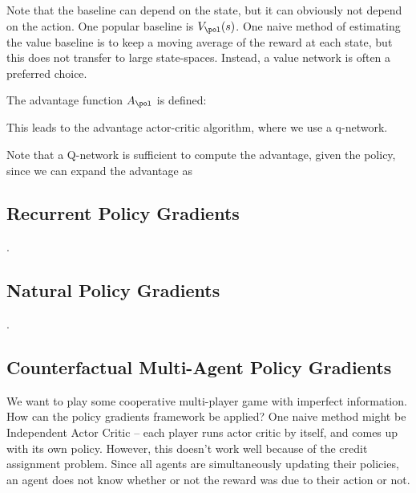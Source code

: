\documentclass[12pt]{article}
\begin{document}

Note that the baseline can depend on the state, but it can obviously not depend on the action. One popular baseline is $V_{\pol}(s)$. One naive method of estimating the value baseline is to keep a moving average of the reward at each state, but this does not transfer to large state-spaces. Instead, a value network is often a preferred choice.

The advantage function $A_{\pol}$ is defined:


This leads to the advantage actor-critic algorithm, where we use a q-network.


Note that a Q-network is sufficient to compute the advantage, given the policy, since we can expand the advantage as


\subsection{Recurrent Policy Gradients}
.
\subsection{Natural Policy Gradients}
.
\subsection{Counterfactual Multi-Agent Policy Gradients}

We want to play some cooperative multi-player game with imperfect information. How can the policy gradients framework be applied? One naive method might be Independent Actor Critic -- each player runs actor critic by itself, and comes up with its own policy. However, this doesn't work well because of the credit assignment problem. Since all agents are simultaneously updating their policies, an agent does not know whether or not the reward was due to their action or not.
\end{document}
